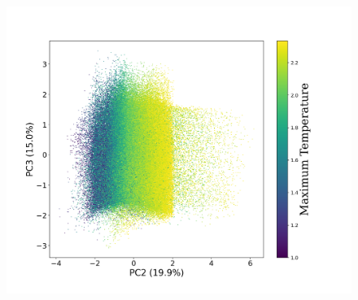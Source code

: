 \documentclass{aa}
\begin{document}
\begin{CJK*}{UTF8}{gbsn}
\begin{figure}[htbp]
{        \label{C1-23-maxtemp}
        \includegraphics[scale = 0.27]{7/PC2&3_maxTemp.png}
        }
        \vspace{-8mm}
        \\
        \subfigure[]{
        \label{C1-23-radfield}
}
\end{figure}
\end{CJK*}
\end{document}
